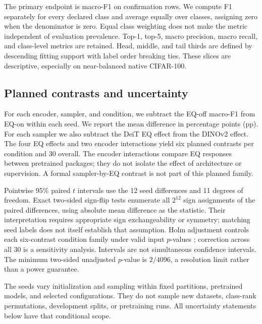 \documentclass[conference]{IEEEtran}
\begin{document}
The primary endpoint is macro-F1 on confirmation rows. We compute F1 separately for every declared class and average equally over classes, assigning zero when the denominator is zero. Equal class weighting does not make the metric independent of evaluation prevalence. Top-1, top-5, macro precision, macro recall, and class-level metrics are retained. Head, middle, and tail thirds are defined by descending fitting support with label order breaking ties. These slices are descriptive, especially on near-balanced native CIFAR-100.

\subsection{Planned contrasts and uncertainty}
For each encoder, sampler, and condition, we subtract the EQ-off macro-F1 from EQ-on within each seed. We report the mean difference in percentage points (pp). For each sampler we also subtract the DeiT EQ effect from the DINOv2 effect. The four EQ effects and two encoder interactions yield six planned contrasts per condition and 30 overall. The encoder interactions compare EQ responses between pretrained packages; they do not isolate the effect of architecture or supervision. A formal sampler-by-EQ contrast is not part of this planned family.

Pointwise 95\% paired $t$ intervals use the 12 seed differences and 11 degrees of freedom. Exact two-sided sign-flip tests enumerate all $2^{12}$ sign assignments of the paired differences, using absolute mean difference as the statistic. Their interpretation requires appropriate sign exchangeability or symmetry; matching seed labels does not itself establish that assumption. Holm adjustment controls each six-contrast condition family under valid input $p$-values \cite{holm1979}; correction across all 30 is a sensitivity analysis. Intervals are not simultaneous confidence intervals. The minimum two-sided unadjusted $p$-value is $2/4096$, a resolution limit rather than a power guarantee.

The seeds vary initialization and sampling within fixed partitions, pretrained models, and selected configurations. They do not sample new datasets, class-rank permutations, development splits, or pretraining runs. All uncertainty statements below have that conditional scope.
\end{document}
